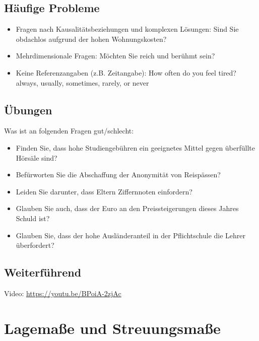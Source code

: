 \documentclass[
]{book}
\providecommand{\tightlist}{%
  \setlength{\itemsep}{0pt}\setlength{\parskip}{0pt}}
\begin{document}
\hypertarget{huxe4ufige-probleme}{%
\section{Häufige Probleme}\label{huxe4ufige-probleme}}

\begin{itemize}
\tightlist
\item
  Fragen nach Kausalitätsbeziehungen und komplexen Lösungen: Sind Sie obdachlos aufgrund der hohen Wohnungskosten?
\item
  Mehrdimensionale Fragen: Möchten Sie reich und berühmt sein?
\item
  Keine Referenzangaben (z.B. Zeitangabe): How often do you feel tired? always, usually, sometimes, rarely, or never
\end{itemize}

\hypertarget{uxfcbungen-1}{%
\section{Übungen}\label{uxfcbungen-1}}

Was ist an folgenden Fragen gut/schlecht:

\begin{itemize}
\tightlist
\item
  Finden Sie, dass hohe Studiengebühren ein geeignetes Mittel gegen
  überfüllte Hörsäle sind?
\item
  Befürworten Sie die Abschaffung der Anonymität von Reispässen?
\item
  Leiden Sie darunter, dass Eltern Ziffernnoten einfordern?
\item
  Glauben Sie auch, dass der Euro an den Preissteigerungen dieses Jahres Schuld ist?
\item
  Glauben Sie, dass der hohe Ausländeranteil in der Pflichtschule die Lehrer
  überfordert?
\end{itemize}

\hypertarget{weiterfuxfchrend-1}{%
\section{Weiterführend}\label{weiterfuxfchrend-1}}

Video: \url{https://youtu.be/BPoiA-2zjAc}

\hypertarget{lagemauxdfe-und-streuungsmauxdfe}{%
\chapter{Lagemaße und Streuungsmaße}\label{lagemauxdfe-und-streuungsmauxdfe}}
\end{document}

